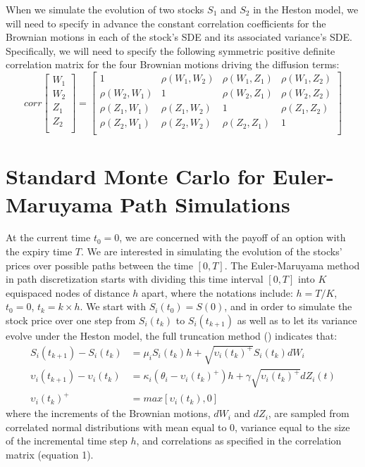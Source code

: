 \documentclass{article}
\begin{document}
	When we simulate the evolution of two stocks $S_1$ and $S_2$ in the Heston model, we will need to specify in advance the constant correlation coefficients for the Brownian motions in each of the stock's SDE and its associated variance's SDE. Specifically, we will need to specify the following symmetric positive definite correlation matrix for the four Brownian motions driving the diffusion terms:
	\begin{equation}
	corr
	\begin{bmatrix} 
	W_1  \\
	W_2  \\
	Z_1  \\
	Z_2  \\
	\end{bmatrix}
	=
	\begin{bmatrix} 
	1 & \rho(W_1,W_2) & \rho(W_1,Z_1) & \rho(W_1,Z_2) \\
	\rho(W_2,W_1) & 1 & \rho(W_2,Z_1) & \rho(W_2,Z_2) \\
	\rho(Z_1,W_1) & \rho(Z_1,W_2) & 1 & \rho(Z_1,Z_2) \\
	\rho(Z_2,W_1) & \rho(Z_2,W_2) & \rho(Z_2,Z_1) & 1 \\
	\end{bmatrix}
	\end{equation}
	
\section{Standard Monte Carlo for Euler-Maruyama Path Simulations}
	At the current time $t_0=0$, we are concerned with the payoff of an option with the expiry time $T$. We are interested in simulating the evolution of the stocks' prices over possible paths between the time $[0,T]$. The Euler-Maruyama method in path discretization starts with dividing this time interval $[0,T]$ into $K$ equispaced nodes of distance $h$ apart, where the notations include: $h = T/K$, $t_0=0$, $t_k=k \times h$. We start with $S_i(t_0)=S(0)$, and in order to simulate the stock price over one step from $S_i(t_k)$ to $S_i(t_{k+1})$ as well as to let its variance evolve under the Heston model, the full truncation method (\cite{andersen07}) indicates that:
	\begin{align}	
	S_i(t_{k+1}) - S_i(t_k) &= \mu_i S_i(t_k) h + \sqrt{\upsilon_i(t_k)^+} S_i(t_k) dW_i \\
	\upsilon_i(t_{k+1}) - \upsilon_i(t_k) &= \kappa_i (\theta_i - \upsilon_i(t_k)^+) h + \gamma \sqrt{\upsilon_i(t_k)^+} dZ_i(t) \\
	\upsilon_i(t_k)^+ &= max[\upsilon_i(t_k), 0]
	\end{align}
	where the increments of the Brownian motions, $dW_i$ and $dZ_i$, are sampled from correlated normal distributions with mean equal to 0, variance equal to the size of the incremental time step $h$, and correlations as specified in the correlation matrix (equation 1). 
	
\end{document}
